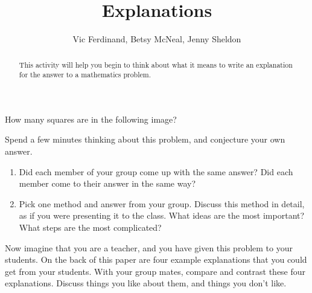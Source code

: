 \documentclass{ximera}
\title{Explanations}
\author{Vic Ferdinand, Betsy McNeal, Jenny Sheldon}
\begin{document}
\begin{abstract} 
This activity will help you begin to think about what it means to write an explanation for the answer to a mathematics problem. 
\end{abstract}
\maketitle


 How many squares are in the following image?
\begin{center}
\end{center}


\begin{problem} 
Spend a few minutes thinking about this problem, and conjecture your own answer.  
\begin{enumerate}
\item Did each member of your group come up with the same answer?  Did each member come to their answer in the same way?



\item
Pick one method and answer from your group.  Discuss this method in detail, as if you were presenting it to the class.  What ideas are the most important?  What steps are the most complicated?

\end{enumerate}
\end{problem}

\begin{problem} 
Now imagine that you are a teacher, and you have given this problem to your students.  On the back of this paper are four example explanations that you could get from your students.  With your group mates, compare and contrast these four explanations.  Discuss things you like about them, and things you don't like.
\end{problem}
\newpage
\end{document}
